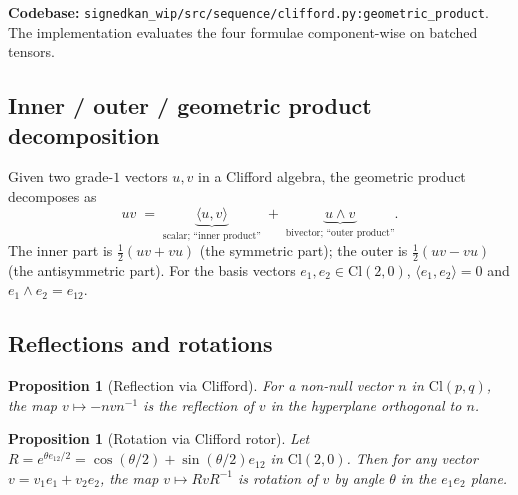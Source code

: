 \documentclass[11pt,a4paper]{article}
\newtheorem{proposition}[theorem]{Proposition}
\theoremstyle{remark}
\newcommand{\Cl}[2]{\mathrm{Cl}(#1, #2)}
\begin{document}
\textbf{Codebase:} \texttt{signedkan\_wip/src/sequence/clifford.py:geometric\_product}.
The implementation evaluates the four formulae component-wise on
batched tensors.

\subsection{Inner / outer / geometric product decomposition}

Given two grade-$1$ vectors $u, v$ in a Clifford algebra, the
geometric product decomposes as
\[
  u v \;=\; \underbrace{\langle u, v \rangle}_{\text{scalar; ``inner product''}}
            \;+\; \underbrace{u \wedge v}_{\text{bivector; ``outer product''}}.
\]
The inner part is $\frac{1}{2}(uv + vu)$ (the symmetric part);
the outer is $\frac{1}{2}(uv - vu)$ (the antisymmetric part). For
the basis vectors $e_1, e_2 \in \Cl{2}{0}$,
$\langle e_1, e_2 \rangle = 0$ and $e_1 \wedge e_2 = e_{12}$.

\subsection{Reflections and rotations}

\begin{proposition}[Reflection via Clifford]
For a non-null vector $n$ in $\Cl{p}{q}$, the map
$v \mapsto -n v n^{-1}$ is the reflection of $v$ in the hyperplane
orthogonal to $n$.
\end{proposition}

\begin{proposition}[Rotation via Clifford rotor]
Let $R = e^{\theta e_{12}/2} = \cos(\theta/2) + \sin(\theta/2) e_{12}$
in $\Cl{2}{0}$. Then for any vector $v = v_1 e_1 + v_2 e_2$, the
map $v \mapsto R v R^{-1}$ is rotation of $v$ by angle $\theta$
in the $e_1 e_2$ plane.
\end{proposition}
\end{document}
